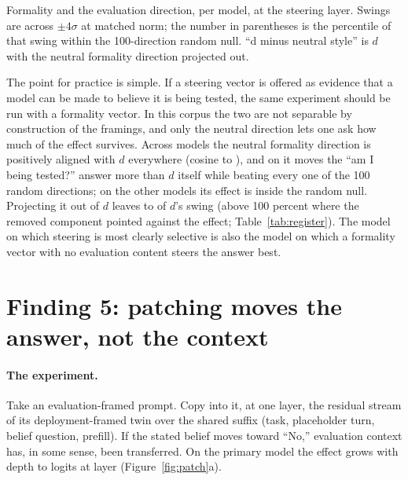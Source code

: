 \documentclass[10pt]{article}
\newcommand{\todo}[1]{\textcolor{red}{[TODO: #1]}}
\begin{document}
\begin{table}[t]\centering\scriptsize
\setlength{\tabcolsep}{3pt}
\resizebox{\linewidth}{!}{%
\IfFileExists{tables/register_v2.tex}{}{\todo{run make\_paper\_assets\_v2}}}
\caption{Formality and the evaluation direction, per model, at the steering
layer. Swings are across $\pm4\sigma$ at matched norm; the number in
parentheses is the percentile of that swing within the 100-direction random
null. ``d minus neutral style'' is $d$ with the neutral formality direction
projected out.}
\label{tab:register}
\end{table}

The point for practice is simple. If a steering vector is offered as
evidence that a model can be made to believe it is being tested, the same
experiment should be run with a formality vector. In this corpus the two are
not separable by construction of the framings, and only the neutral direction
lets one ask how much of the effect survives. Across models the neutral
formality direction is positively aligned with $d$ everywhere (cosine
\VcosNeutralMin{} to \VcosNeutralMax{}), and on \VneutralBeatsD{} it moves
the ``am I being tested?'' answer more than $d$ itself while beating every one
of the 100 random directions; on the other models its effect is inside the
random null. Projecting it out of $d$ leaves \VfracNeutralMin{} to
\VfracNeutralMax{} of $d$'s swing (above 100 percent where the removed
component pointed against the effect; Table~\ref{tab:register}). The model on
which steering is most clearly selective is also the model on which a
formality vector with no evaluation content steers the answer best.

\section{Finding 5: patching moves the answer, not the context}\label{sec:patch}

\paragraph{The experiment.} Take an evaluation-framed prompt. Copy into it,
at one layer, the residual stream of its deployment-framed twin over the
shared suffix (task, placeholder turn, belief question, prefill). If the
stated belief moves toward ``No,'' evaluation context has, in some sense,
been transferred. On the primary model the effect grows with depth to
\NpatchMax{} logits at layer \NpatchPeakLayer{} (Figure~\ref{fig:patch}a).
\end{document}
